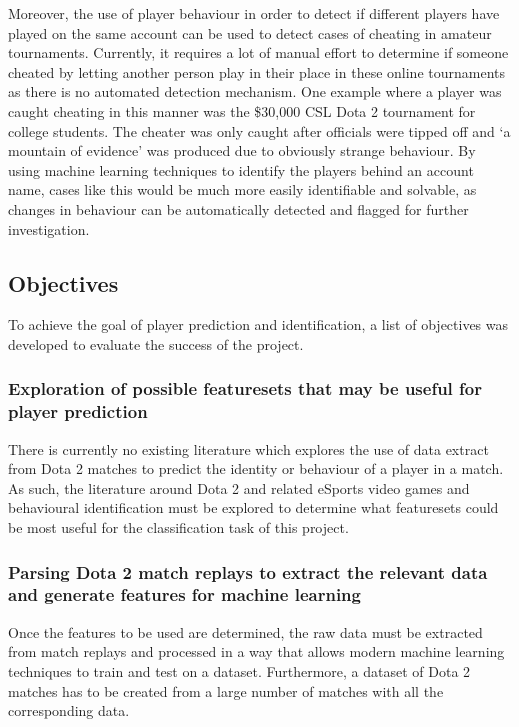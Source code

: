 \documentclass[Report.tex]{subfiles}
\begin{document}
Moreover, the use of player behaviour in order to detect if different players have played on the same account can be used to detect cases of cheating in amateur tournaments. Currently, it requires a lot of manual effort to determine if someone cheated by letting another person play in their place in these online tournaments as there is no automated detection mechanism. One example where a player was caught cheating in this manner was the \$30,000 CSL Dota 2 tournament for college students. The cheater was only caught after officials were tipped off and `a mountain of evidence' was produced \cite{dota-cheating} due to obviously strange behaviour. By using machine learning techniques to identify the players behind an account name, cases like this would be much more easily identifiable and solvable, as changes in behaviour can be automatically detected and flagged for further investigation. 

\subsection{Objectives}
To achieve the goal of player prediction and identification, a list of objectives was developed to evaluate the success of the project. 

\subsubsection{Exploration of possible featuresets that may be useful for player prediction}
There is currently no existing literature which explores the use of data extract from Dota 2 matches to predict the identity or behaviour of a player in a match. As such, the literature around Dota 2 and related eSports video games and behavioural identification must be explored to determine what featuresets could be most useful for the classification task of this project. 

\subsubsection{Parsing Dota 2 match replays to extract the relevant data and generate features for machine learning}
Once the features to be used are determined, the raw data must be extracted from match replays and processed in a way that allows modern machine learning techniques to train and test on a dataset. Furthermore, a dataset of Dota 2 matches has to be created from a large number of matches with all the corresponding data. 
\end{document}
